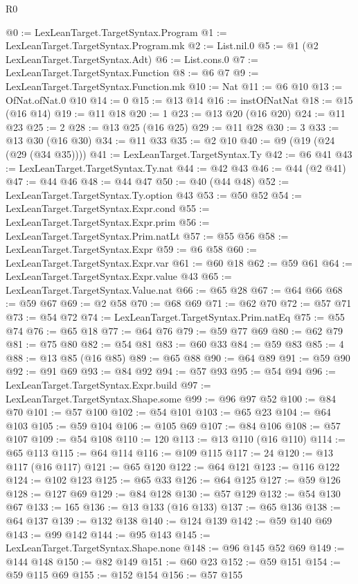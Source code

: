 \begin{lexlean}{R0}
\begin{coremodule}
@0 := LexLeanTarget.TargetSyntax.Program
@1 := LexLeanTarget.TargetSyntax.Program.mk
@2 := List.nil.{0}
@5 := @1 (@2 LexLeanTarget.TargetSyntax.Adt)
@6 := List.cons.{0}
@7 := LexLeanTarget.TargetSyntax.Function
@8 := @6 @7
@9 := LexLeanTarget.TargetSyntax.Function.mk
@10 := Nat
@11 := @6 @10
@13 := OfNat.ofNat.{0} @10
@14 := 0
@15 := @13 @14
@16 := instOfNatNat
@18 := @15 (@16 @14)
@19 := @11 @18
@20 := 1
@23 := @13 @20 (@16 @20)
@24 := @11 @23
@25 := 2
@28 := @13 @25 (@16 @25)
@29 := @11 @28
@30 := 3
@33 := @13 @30 (@16 @30)
@34 := @11 @33
@35 := @2 @10
@40 := @9 (@19 (@24 (@29 (@34 @35))))
@41 := LexLeanTarget.TargetSyntax.Ty
@42 := @6 @41
@43 := LexLeanTarget.TargetSyntax.Ty.nat
@44 := @42 @43
@46 := @44 (@2 @41)
@47 := @44 @46
@48 := @44 @47
@50 := @40 (@44 @48)
@52 := LexLeanTarget.TargetSyntax.Ty.option @43
@53 := @50 @52
@54 := LexLeanTarget.TargetSyntax.Expr.cond
@55 := LexLeanTarget.TargetSyntax.Expr.prim
@56 := LexLeanTarget.TargetSyntax.Prim.natLt
@57 := @55 @56
@58 := LexLeanTarget.TargetSyntax.Expr
@59 := @6 @58
@60 := LexLeanTarget.TargetSyntax.Expr.var
@61 := @60 @18
@62 := @59 @61
@64 := LexLeanTarget.TargetSyntax.Expr.value @43
@65 := LexLeanTarget.TargetSyntax.Value.nat
@66 := @65 @28
@67 := @64 @66
@68 := @59 @67
@69 := @2 @58
@70 := @68 @69
@71 := @62 @70
@72 := @57 @71
@73 := @54 @72
@74 := LexLeanTarget.TargetSyntax.Prim.natEq
@75 := @55 @74
@76 := @65 @18
@77 := @64 @76
@79 := @59 @77 @69
@80 := @62 @79
@81 := @75 @80
@82 := @54 @81
@83 := @60 @33
@84 := @59 @83
@85 := 4
@88 := @13 @85 (@16 @85)
@89 := @65 @88
@90 := @64 @89
@91 := @59 @90
@92 := @91 @69
@93 := @84 @92
@94 := @57 @93
@95 := @54 @94
@96 := LexLeanTarget.TargetSyntax.Expr.build
@97 := LexLeanTarget.TargetSyntax.Shape.some
@99 := @96 @97 @52
@100 := @84 @70
@101 := @57 @100
@102 := @54 @101
@103 := @65 @23
@104 := @64 @103
@105 := @59 @104
@106 := @105 @69
@107 := @84 @106
@108 := @57 @107
@109 := @54 @108
@110 := 120
@113 := @13 @110 (@16 @110)
@114 := @65 @113
@115 := @64 @114
@116 := @109 @115
@117 := 24
@120 := @13 @117 (@16 @117)
@121 := @65 @120
@122 := @64 @121
@123 := @116 @122
@124 := @102 @123
@125 := @65 @33
@126 := @64 @125
@127 := @59 @126
@128 := @127 @69
@129 := @84 @128
@130 := @57 @129
@132 := @54 @130 @67
@133 := 165
@136 := @13 @133 (@16 @133)
@137 := @65 @136
@138 := @64 @137
@139 := @132 @138
@140 := @124 @139
@142 := @59 @140 @69
@143 := @99 @142
@144 := @95 @143
@145 := LexLeanTarget.TargetSyntax.Shape.none
@148 := @96 @145 @52 @69
@149 := @144 @148
@150 := @82 @149
@151 := @60 @23
@152 := @59 @151
@154 := @59 @115 @69
@155 := @152 @154
@156 := @57 @155

\end{coremodule}
\end{lexlean}
